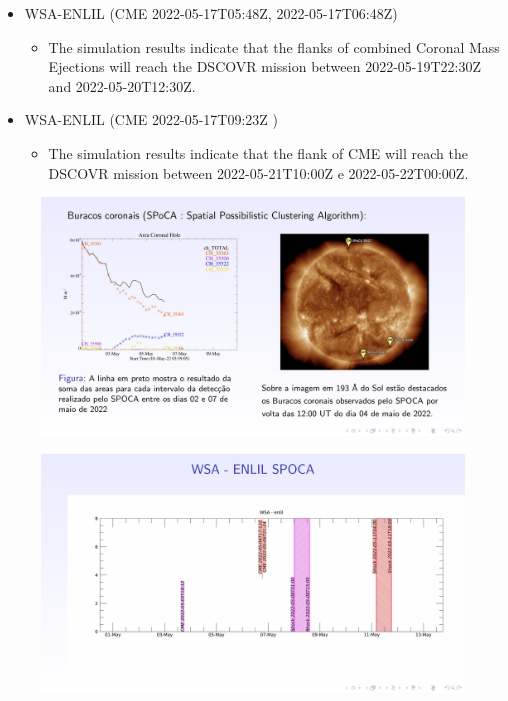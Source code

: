\documentclass[a4paper, 10pt]{article}
\begin{document}
\begin{itemize} 
 \item WSA-ENLIL (CME 2022-05-17T05:48Z, 2022-05-17T06:48Z)
\begin{itemize} 
 \item The simulation results indicate that the flanks of combined Coronal Mass Ejections will reach the DSCOVR mission between 2022-05-19T22:30Z and 2022-05-20T12:30Z.
\end{itemize} 
 \item WSA-ENLIL (CME 2022-05-17T09:23Z )
\begin{itemize} 
 \item The simulation results indicate that the flank of CME will reach the DSCOVR mission between 2022-05-21T10:00Z e 2022-05-22T00:00Z. 
\end{itemize} 
 \end{itemize} 
 
\begin{figure}[H]
    
                        \centering
   
                             \includegraphics[width=14cm]{./figures/en_outfileSun_0.jpg}

                        \end{figure}

                     \begin{figure}[H]
    
                        \centering
   
                             \includegraphics[width=14cm]{./figures/en_outfileSun_1.jpg}

                        \end{figure}
\end{document}
